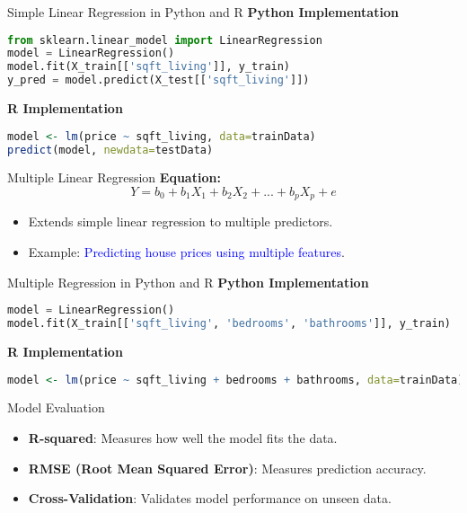 \documentclass{beamer}
\begin{document}
\begin{frame}[fragile]{Simple Linear Regression in Python and R}
    \textbf{Python Implementation}
    \begin{lstlisting}[language=Python]
from sklearn.linear_model import LinearRegression
model = LinearRegression()
model.fit(X_train[['sqft_living']], y_train)
y_pred = model.predict(X_test[['sqft_living']])
    \end{lstlisting}

    \textbf{R Implementation}
    \begin{lstlisting}[language=R]
model <- lm(price ~ sqft_living, data=trainData)
predict(model, newdata=testData)
    \end{lstlisting}
\end{frame}

\begin{frame}{Multiple Linear Regression}
    \textbf{Equation:}
    \[
    Y = b_0 + b_1X_1 + b_2X_2 + ... + b_pX_p + e
    \]
    \begin{itemize}
        \item Extends simple linear regression to multiple predictors.
        \item Example: \textcolor{blue}{Predicting house prices using multiple features}.
    \end{itemize}
\end{frame}

\begin{frame}[fragile]{Multiple Regression in Python and R}
    \textbf{Python Implementation}
    \begin{lstlisting}[language=Python]
model = LinearRegression()
model.fit(X_train[['sqft_living', 'bedrooms', 'bathrooms']], y_train)
    \end{lstlisting}

    \textbf{R Implementation}
    \begin{lstlisting}[language=R]
model <- lm(price ~ sqft_living + bedrooms + bathrooms, data=trainData)
    \end{lstlisting}
\end{frame}

\begin{frame}{Model Evaluation}
    \begin{itemize}
        \item \textbf{R-squared}: Measures how well the model fits the data.
        \item \textbf{RMSE (Root Mean Squared Error)}: Measures prediction accuracy.
        \item \textbf{Cross-Validation}: Validates model performance on unseen data.
    \end{itemize}
\end{frame}
\end{document}
